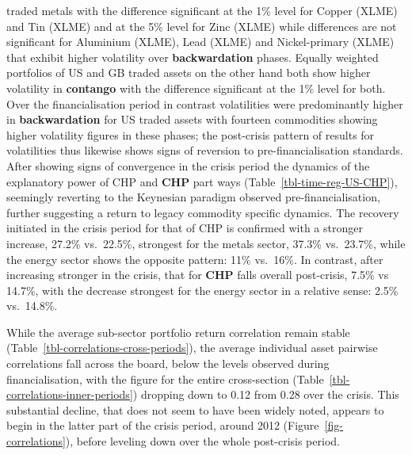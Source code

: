 \documentclass[
  authoryear,
  preprint,
  3p]{elsarticle}
\begin{document}
traded metals with the difference significant at the 1\% level for
Copper (XLME) and Tin (XLME) and at the 5\% level for Zinc (XLME) while
differences are not significant for Aluminium (XLME), Lead (XLME) and
Nickel-primary (XLME) that exhibit higher volatility over
\textbf{backwardation} phases. Equally weighted portfolios of US and GB
traded assets on the other hand both show higher volatility in
\textbf{contango} with the difference significant at the 1\% level for
both. Over the financialisation period in contrast volatilities were
predominantly higher in \textbf{backwardation} for US traded assets with
fourteen commodities showing higher volatility figures in these phases;
the post-crisis pattern of results for volatilities thus likewise shows
signs of reversion to pre-financialisation standards. After showing
signs of convergence in the crisis period the dynamics of the
explanatory power of CHP and \textbf{CHP} part ways
(Table~\ref{tbl-time-reg-US-CHP}), seemingly reverting to the Keynesian
paradigm observed pre-financialisation, further suggesting a return to
legacy commodity specific dynamics. The recovery initiated in the crisis
period for that of CHP is confirmed with a stronger increase, 27.2\%
vs.~22.5\%, strongest for the metals sector, 37.3\% vs.~23.7\%, while
the energy sector shows the opposite pattern: 11\% vs.~16\%. In
contrast, after increasing stronger in the crisis, that for \textbf{CHP}
falls overall post-crisis, 7.5\% vs 14.7\%, with the decrease strongest
for the energy sector in a relative sense: 2.5\% vs.~14.8\%.

\medskip

While the average sub-sector portfolio return correlation remain stable
(Table~\ref{tbl-correlations-cross-periods}), the average individual
asset pairwise correlations fall across the board, below the levels
observed during financialisation, with the figure for the entire
cross-section (Table~\ref{tbl-correlations-inner-periods}) dropping down
to 0.12 from 0.28 over the crisis. This substantial decline, that does
not seem to have been widely noted, appears to begin in the latter part
of the crisis period, around 2012 (Figure~\ref{fig-correlations}),
before leveling down over the whole post-crisis period.

\medskip
\end{document}
